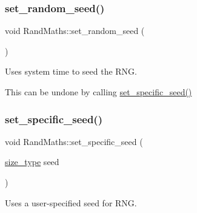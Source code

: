 \subsubsection{\texorpdfstring{set\+\_\+random\+\_\+seed()}{set\_random\_seed()}}
{\footnotesize\ttfamily void Rand\+Maths\+::set\+\_\+random\+\_\+seed (\begin{DoxyParamCaption}{ }\end{DoxyParamCaption})}



Uses system time to seed the R\+NG. 

This can be undone by calling {\ttfamily \hyperlink{classretrocombinator_1_1RandMaths_a0bf1c2e7a1eccb1f9246b3fceeb5db8a}{set\+\_\+specific\+\_\+seed()}} \mbox{\label{classretrocombinator_1_1RandMaths_a0bf1c2e7a1eccb1f9246b3fceeb5db8a}} 
\subsubsection{\texorpdfstring{set\+\_\+specific\+\_\+seed()}{set\_specific\_seed()}}
{\footnotesize\ttfamily void Rand\+Maths\+::set\+\_\+specific\+\_\+seed (\begin{DoxyParamCaption}\item[{\hyperlink{constants_8h_a8e1541b50cee66a791df4c437ccbb385}{size\+\_\+type}}]{seed }\end{DoxyParamCaption})}



Uses a user-\/specified seed for R\+NG. 

